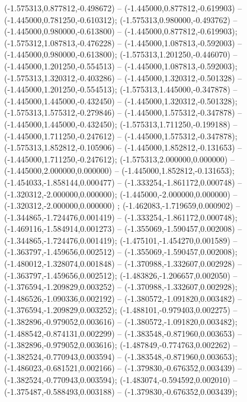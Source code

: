 (-1.575313,0.877812,-0.498672) -- (-1.445000,0.877812,-0.619903) -- (-1.445000,0.781250,-0.610312);
 (-1.575313,0.980000,-0.493762) -- (-1.445000,0.980000,-0.613800) -- (-1.445000,0.877812,-0.619903);
 (-1.575312,1.087813,-0.476228) -- (-1.445000,1.087813,-0.592003) -- (-1.445000,0.980000,-0.613800);
 (-1.575313,1.201250,-0.446070) -- (-1.445000,1.201250,-0.554513) -- (-1.445000,1.087813,-0.592003);
 (-1.575313,1.320312,-0.403286) -- (-1.445000,1.320312,-0.501328) -- (-1.445000,1.201250,-0.554513);
 (-1.575313,1.445000,-0.347878) -- (-1.445000,1.445000,-0.432450) -- (-1.445000,1.320312,-0.501328);
 (-1.575313,1.575312,-0.279846) -- (-1.445000,1.575312,-0.347878) -- (-1.445000,1.445000,-0.432450);
 (-1.575313,1.711250,-0.199188) -- (-1.445000,1.711250,-0.247612) -- (-1.445000,1.575312,-0.347878);
 (-1.575313,1.852812,-0.105906) -- (-1.445000,1.852812,-0.131653) -- (-1.445000,1.711250,-0.247612);
 (-1.575313,2.000000,0.000000) -- (-1.445000,2.000000,0.000000) -- (-1.445000,1.852812,-0.131653);
 (-1.454033,-1.858144,0.000477) -- (-1.333254,-1.861172,0.000748) -- (-1.320312,-2.000000,0.000000);
 (-1.445000,-2.000000,0.000000) -- (-1.320312,-2.000000,0.000000) ;
 (-1.462083,-1.719659,0.000902) -- (-1.344865,-1.724476,0.001419) -- (-1.333254,-1.861172,0.000748);
 (-1.469116,-1.584914,0.001273) -- (-1.355069,-1.590457,0.002008) -- (-1.344865,-1.724476,0.001419);
 (-1.475101,-1.454270,0.001589) -- (-1.363797,-1.459656,0.002512) -- (-1.355069,-1.590457,0.002008);
 (-1.480012,-1.328074,0.001848) -- (-1.370988,-1.332607,0.002928) -- (-1.363797,-1.459656,0.002512);
 (-1.483826,-1.206657,0.002050) -- (-1.376594,-1.209829,0.003252) -- (-1.370988,-1.332607,0.002928);
 (-1.486526,-1.090336,0.002192) -- (-1.380572,-1.091820,0.003482) -- (-1.376594,-1.209829,0.003252);
 (-1.488101,-0.979403,0.002275) -- (-1.382896,-0.979052,0.003616) -- (-1.380572,-1.091820,0.003482);
 (-1.488542,-0.874131,0.002299) -- (-1.383548,-0.871960,0.003653) -- (-1.382896,-0.979052,0.003616);
 (-1.487849,-0.774763,0.002262) -- (-1.382524,-0.770943,0.003594) -- (-1.383548,-0.871960,0.003653);
 (-1.486023,-0.681521,0.002166) -- (-1.379830,-0.676352,0.003439) -- (-1.382524,-0.770943,0.003594);
 (-1.483074,-0.594592,0.002010) -- (-1.375487,-0.588493,0.003188) -- (-1.379830,-0.676352,0.003439);
